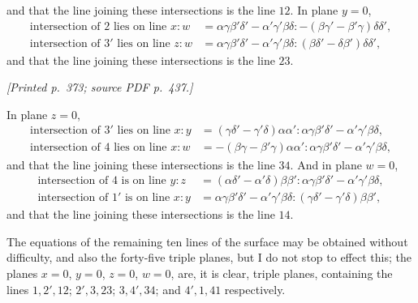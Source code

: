 \documentclass[11pt,a4paper]{article}
\newcommand{\sourcepage}[2]{\par\smallskip\noindent\textit{[Printed p.~#1; source PDF p.~#2.]}\par\smallskip}
\begin{document}
and that the line joining these intersections is the line $12$. In plane $y=0$,
\[
\begin{array}{rl}
\text{intersection of }2 \text{ lies on line } x:w
  &= \alpha\gamma\beta'\delta'-\alpha'\gamma'\beta\delta :
     -(\beta\gamma'-\beta'\gamma)\delta\delta',\\
\text{intersection of }3' \text{ lies on line } z:w
  &= \alpha\gamma\beta'\delta'-\alpha'\gamma'\beta\delta :
     (\beta\delta'-\delta\beta')\delta\delta',
\end{array}
\]
and that the line joining these intersections is the line $23$.

\sourcepage{373}{437}
In plane $z=0$,
\[
\begin{array}{rl}
\text{intersection of }3' \text{ lies on line } x:y
  &= (\gamma\delta'-\gamma'\delta)\alpha\alpha' :
     \alpha\gamma\beta'\delta'-\alpha'\gamma'\beta\delta,\\
\text{intersection of }4 \text{ lies on line } x:w
  &= -(\beta\gamma-\beta'\gamma)\alpha\alpha' :
     \alpha\gamma\beta'\delta'-\alpha'\gamma'\beta\delta,
\end{array}
\]
and that the line joining these intersections is the line $34$. And in plane $w=0$,
\[
\begin{array}{rl}
\text{intersection of }4 \text{ is on line } y:z
 &= (\alpha\delta'-\alpha'\delta)\beta\beta' :
    \alpha\gamma\beta'\delta'-\alpha'\gamma'\beta\delta,\\
\text{intersection of }1' \text{ is on line } x:y
 &= \alpha\gamma\beta'\delta'-\alpha'\gamma'\beta\delta :
    (\gamma\delta'-\gamma'\delta)\beta\beta',
\end{array}
\]
and that the line joining these intersections is the line $14$.

The equations of the remaining ten lines of the surface may be obtained without
difficulty, and also the forty-five triple planes, but I do not stop to effect this; the
planes $x=0$, $y=0$, $z=0$, $w=0$, are, it is clear, triple planes, containing the lines
$1,2',12$; $2',3,23$; $3,4',34$; and $4',1,41$ respectively.
\end{document}
